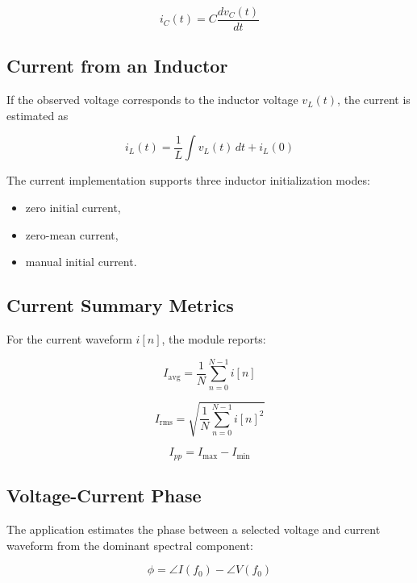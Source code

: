 \documentclass[conference]{IEEEtran}
\begin{document}
\begin{equation}
i_C(t) = C\frac{dv_C(t)}{dt}
\end{equation}

\subsection{Current from an Inductor}
If the observed voltage corresponds to the inductor voltage $v_L(t)$, the current is estimated as

\begin{equation}
i_L(t) = \frac{1}{L}\int v_L(t)\,dt + i_L(0)
\end{equation}

The current implementation supports three inductor initialization modes:

\begin{itemize}
    \item zero initial current,
    \item zero-mean current,
    \item manual initial current.
\end{itemize}

\subsection{Current Summary Metrics}
For the current waveform $i[n]$, the module reports:

\begin{equation}
I_{\mathrm{avg}} = \frac{1}{N}\sum_{n=0}^{N-1} i[n]
\end{equation}

\begin{equation}
I_{\mathrm{rms}} = \sqrt{\frac{1}{N}\sum_{n=0}^{N-1} i[n]^2}
\end{equation}

\begin{equation}
I_{pp} = I_{\max} - I_{\min}
\end{equation}

\subsection{Voltage-Current Phase}
The application estimates the phase between a selected voltage and current waveform from the dominant spectral component:

\begin{equation}
\phi = \angle I(f_0) - \angle V(f_0)
\end{equation}
\end{document}
